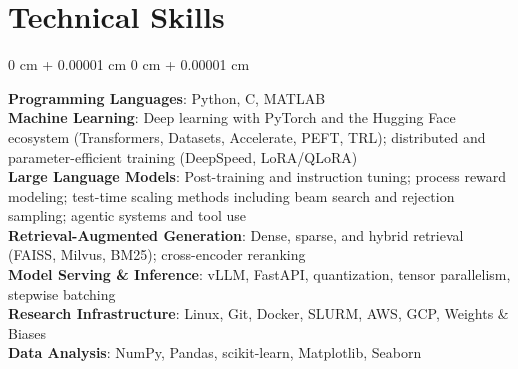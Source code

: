 \documentclass[11pt, letterpaper]{article}
\newenvironment{highlights}{
    \begin{itemize}[
        topsep=0.10 cm,
        parsep=0.10 cm,
        partopsep=0pt,
        itemsep=0pt,
        leftmargin=0 cm + 10pt
    ]
}{
    \end{itemize}
} %
\newenvironment{onecolentry}{
    \Needspace{3\baselineskip}
    \begin{adjustwidth}{
        0 cm + 0.00001 cm
    }{
        0 cm + 0.00001 cm
    }
}{
    \end{adjustwidth}
} %
\begin{document}
\section{Technical Skills}
        \begin{onecolentry}
        \textbf{Programming Languages}: Python, C, MATLAB \\
        \vspace{0.08 cm}
        \textbf{Machine Learning}: Deep learning with PyTorch and the Hugging Face ecosystem (Transformers, Datasets, Accelerate, PEFT, TRL); distributed and parameter-efficient training (DeepSpeed, LoRA/QLoRA) \\
        \vspace{0.08 cm}
        \textbf{Large Language Models}: Post-training and instruction tuning; process reward modeling; test-time scaling methods including beam search and rejection sampling; agentic systems and tool use \\
        \vspace{0.08 cm}
        \textbf{Retrieval-Augmented Generation}: Dense, sparse, and hybrid retrieval (FAISS, Milvus, BM25); cross-encoder reranking \\
        \vspace{0.08 cm}
        \textbf{Model Serving \& Inference}: vLLM, FastAPI, quantization, tensor parallelism, stepwise batching \\
        \vspace{0.08 cm}
        \textbf{Research Infrastructure}: Linux, Git, Docker, SLURM, AWS, GCP, Weights \& Biases \\
        \vspace{0.08 cm}
        \textbf{Data Analysis}: NumPy, Pandas, scikit-learn, Matplotlib, Seaborn
        \end{onecolentry}
            \vspace{0.15 cm}
\end{document}
